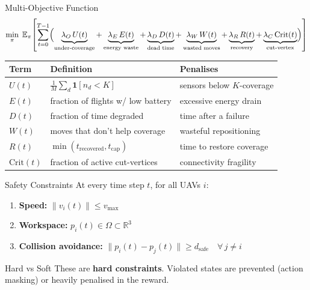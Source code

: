 \documentclass[aspectratio=169,12pt]{beamer}
\begin{document}
\begin{frame}{Multi-Objective Function}
\[
\min_{\pi}\;
\mathbb{E}_{\pi}
\!\left[
\sum_{t=0}^{T-1}
\Bigl(
  \underbrace{\lambda_O\, U(t)}_{\text{under-coverage}}
  + \underbrace{\lambda_E\, E(t)}_{\text{energy waste}}
  + \underbrace{\lambda_D\, D(t)}_{\text{dead time}}
  + \underbrace{\lambda_W\, W(t)}_{\text{wasted moves}}
  + \underbrace{\lambda_R\, R(t)}_{\text{recovery}}
  + \underbrace{\lambda_C\, \text{Crit}(t)}_{\text{cut-vertex}}
\Bigr)
\right]
\]

\vspace{0.4em}
\begin{tabular}{@{}lll@{}}
\toprule
\textbf{Term} & \textbf{Definition} & \textbf{Penalises} \\
\midrule
$U(t)$ & $\frac{1}{M}\sum_d \mathbf{1}[n_d{<}K]$ & sensors below $K$-coverage \\
$E(t)$ & fraction of flights w/ low battery & excessive energy drain \\
$D(t)$ & fraction of time degraded & time after a failure \\
$W(t)$ & moves that don't help coverage & wasteful repositioning \\
$R(t)$ & $\min(t_{\text{recovered}}, t_{\text{cap}})$ & time to restore coverage \\
$\text{Crit}(t)$ & fraction of active cut-vertices & connectivity fragility \\
\bottomrule
\end{tabular}
\end{frame}

\begin{frame}{Safety Constraints}
At every time step $t$, for all UAVs $i$:

\vspace{0.5em}
\begin{enumerate}
    \item \textbf{Speed:}
    $\|v_i(t)\| \le v_{\max}$
    
    \vspace{0.3em}
    \item \textbf{Workspace:}
    $p_i(t) \in \Omega \subset \mathbb{R}^3$
    
    \vspace{0.3em}
    \item \textbf{Collision avoidance:}
    $\|p_i(t) - p_j(t)\| \ge d_{\text{safe}}
    \quad \forall\, j \ne i$
\end{enumerate}

\vspace{0.5em}
\begin{block}{Hard vs Soft}
These are \textbf{hard constraints}. Violated states are prevented (action masking) or heavily penalised in the reward.
\end{block}
\end{frame}
\end{document}
